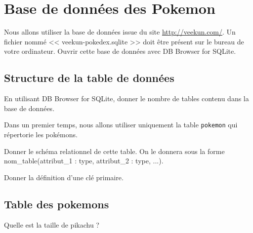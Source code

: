
\section*{Base de données des Pokemon}
\label{sec:bdd}

Nous allons utiliser la base de données issue du site \url{http://veekun.com/}. Un fichier nommé << veekun-pokedex.sqlite >> doit être présent sur le bureau de votre ordinateur. Ouvrir cette base de données avec DB Browser for SQLite.


%

\subsection*{Structure de la table de données}

\question{}
En utilisant DB Browser for SQLite, donner le nombre de tables contenu dans la base de données. 


Dans un premier temps, nous allons utiliser uniquement la table \texttt{pokemon} qui répertorie les pokémons.

\question{}
Donner le schéma relationnel de cette table. On le donnera sous la forme nom\_table(attribut\_1 : type, attribut\_2 : type, ...).

\question{}
Donner la définition d'une clé primaire.

\subsection*{Table des pokemons}



\question{}
Quelle est la taille de pikachu ?

